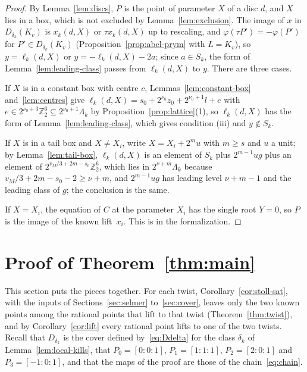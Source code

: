 \documentclass[11pt]{amsart}
\theoremstyle{definition}
\numberwithin{equation}{section}
\newcommand{\Zt}{\mathbb{Z}_2}
\newcommand{\kv}{K_v}
\begin{document}
\begin{proof}
By Lemma~\ref{lem:discs}, $P$ is the point of parameter $X$ of a disc $d$, and $X$ lies in a box, which is not excluded by Lemma~\ref{lem:exclusion}. The image of $x$ in $D_{\delta_k}(\kv)$ is $x_k(d,X)$ or $\tau x_k(d,X)$ up to rescaling, and $\varphi(\tau P')=-\varphi(P')$ for $P'\in D_{\delta_k}(\kv)$ (Proposition~\ref{prop:abel-prym} with $L=\kv$), so $y=\ell_k(d,X)$ or $y=-\ell_k(d,X)-2a$; since $a\in S_k$, the form of Lemma~\ref{lem:leading-class} passes from $\ell_k(d,X)$ to $y$. There are three cases.

If $X$ is in a constant box with centre $c$, Lemmas~\ref{lem:constant-box} and~\ref{lem:centres} give $\ell_k(d,X)=s_0+2^{\nu_0}z_0+2^{\nu_0+1}l+e$ with $e\in2^{\nu_0+3}\Zt^6\subseteq2^{\nu_0+1}\Lambda_k$ by Proposition~\ref{prop:lattice}(1), so $\ell_k(d,X)$ has the form of Lemma~\ref{lem:leading-class}, which gives condition (iii) and $y\notin S_k$.

If $X$ is in a tail box and $X\neq X_i$, write $X=X_i+2^mu$ with $m\ge s$ and $u$ a unit; by Lemma~\ref{lem:tail-box}, $\ell_k(d,X)$ is an element of $S_k$ plus $2^{m-1}ug$ plus an element of $2^{v_M/3+2m-s_0}\Zt^6$, which lies in $2^{\nu+m}\Lambda_k$ because $v_M/3+2m-s_0-2\ge\nu+m$, and $2^{m-1}ug$ has leading level $\nu+m-1$ and the leading class of $g$; the conclusion is the same.

If $X=X_i$,
 the equation of $C$ at the parameter $X_i$ has the single root $Y=0$, so $P$ is the image of the known lift~$x_i$. This is  in the formalization.
\end{proof}

\section{Proof of Theorem~\ref{thm:main}}\label{sec:proof}

This section puts the pieces together. For each twist, Corollary~\ref{cor:stoll-sat}, with the inputs of Sections~\ref{sec:selmer} to~\ref{sec:cover}, leaves only the two known points among the rational points that lift to that twist (Theorem~\ref{thm:twist}), and by Corollary~\ref{cor:lift} every rational point lifts to one of the two twists. Recall that $D_{\delta_k}$ is the cover defined by~\eqref{eq:Ddelta} for the class $\delta_k$ of Lemma~\ref{lem:local-kills}, that $P_0=[0:0:1]$, $P_1=[1:1:1]$, $P_2=[2:0:1]$ and $P_3=[-1:0:1]$, and that the maps of the proof are those of the chain~\eqref{eq:chain}.
\end{document}
